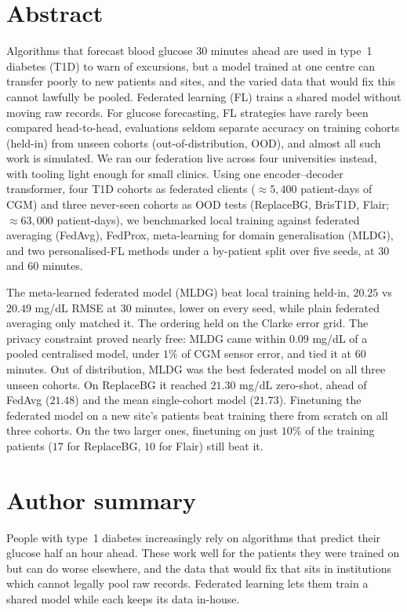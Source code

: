 \documentclass[10pt,letterpaper]{article}
\begin{document}
\section*{Abstract}
Algorithms that forecast blood glucose 30 minutes ahead are used in type~1
diabetes (T1D) to warn of excursions, but a model trained at one centre can
transfer poorly to new patients and sites, and the varied data that would
fix this cannot lawfully be pooled. Federated learning (FL)
trains a shared model without moving raw records. For glucose forecasting, FL
strategies have rarely been compared head-to-head, evaluations seldom
separate accuracy on training cohorts (held-in) from unseen cohorts
(out-of-distribution, OOD), and almost all such work is simulated.
We ran our federation live across four universities instead, with tooling
light enough for small clinics. Using one encoder--decoder transformer, four
T1D cohorts as federated clients ($\approx 5{,}400$ patient-days of CGM) and
three never-seen cohorts as OOD tests (ReplaceBG, BrisT1D, Flair;
$\approx 63{,}000$ patient-days), we benchmarked local
training against federated
averaging (FedAvg), FedProx, meta-learning for domain generalisation (MLDG),
and two personalised-FL methods under a by-patient split over five seeds, at
30 and 60 minutes.

The meta-learned federated model (MLDG) beat local training held-in,
$20.25$ vs $20.49$ mg/dL RMSE at 30 minutes, lower on
every seed, while plain federated averaging only matched it. The ordering
held on the Clarke error grid. The privacy
constraint proved nearly free: MLDG came within $0.09$ mg/dL of a
pooled centralised model, under $1\%$ of CGM sensor error,
and tied it at 60 minutes.
Out of distribution, MLDG was the best federated model on all three unseen
cohorts. On ReplaceBG it reached
$21.30$ mg/dL zero-shot, ahead of FedAvg ($21.48$)
and the mean single-cohort model ($21.73$). Finetuning the federated model
on a new site's
patients beat training there from scratch on all three cohorts. On the two
larger ones, finetuning on just $10\%$ of the training patients ($17$ for
ReplaceBG, $10$ for Flair) still beat it.

\section*{Author summary}
People with type~1 diabetes increasingly rely on algorithms that predict their
glucose half an hour ahead. These work well for the patients they were trained
on but can do worse elsewhere, and the data that would fix that sits in
institutions which cannot legally pool raw records. Federated learning lets
them train a shared model while each keeps its data in-house.
\end{document}
